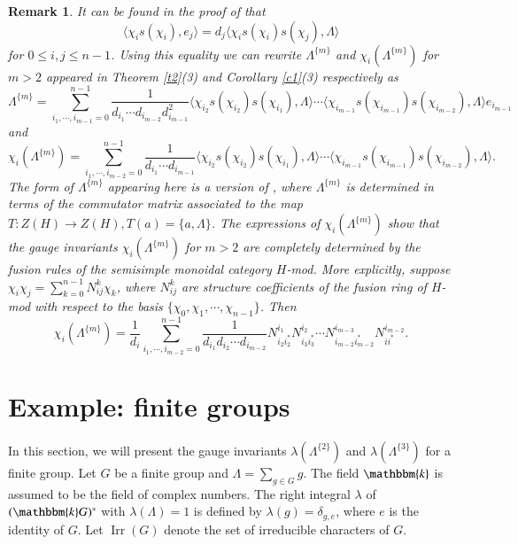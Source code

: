 \documentclass[11pt]{amsart}
\newtheorem{rem}[thm]{Remark}
\numberwithin{equation}{section}
\begin{document}
\begin{rem}
It can be found in the proof of \cite[Proposition 2.1(1)]{CW} that $$\langle\chi_{i}s(\chi_{i}),e_{j}\rangle=d_j\langle\chi_{i}s(\chi_{i})s(\chi_{j}),\Lambda\rangle$$ for $0\leq i,j\leq n-1$. Using this equality we can rewrite  $\Lambda^{\{m\}}$ and $\chi_i(\Lambda^{\{m\}})$ for $m>2$ appeared in Theorem \ref{t2}(3) and Corollary \ref{c1}(3) respectively as 
$$\Lambda^{\{m\}}=\sum_{i_1,\cdots,i_{m-1}=0}^{n-1}\frac{1}{d_{i_1}\cdots d_{i_{m-2}} d^2_{i_{m-1}}}\langle\chi_{i_2}s(\chi_{i_2})s(\chi_{i_1}),\Lambda\rangle\cdots \langle\chi_{i_{m-1}}s(\chi_{i_{m-1}})s(\chi_{i_{m-2}}),\Lambda\rangle e_{i_{m-1}}
$$ and
$$\chi_i(\Lambda^{\{m\}})=\sum_{i_1,\cdots,i_{m-2}=0}^{n-1}\frac{1}{d_{i_1}\cdots d_{i_{m-1}}}\langle\chi_{i_2}s(\chi_{i_2})s(\chi_{i_1}),\Lambda\rangle\cdots \langle\chi_{i_{m-1}}s(\chi_{i_{m-1}})s(\chi_{i_{m-2}}),\Lambda\rangle.$$
The form of $\Lambda^{\{m\}}$ appearing here is a version of  \cite[Proposition 2.2]{CW}, where $\Lambda^{\{m\}}$ is determined in terms of the commutator matrix associated to the map $T:Z(H)\rightarrow Z(H), T(a)=\{a,\Lambda\}$. The expressions of $\chi_i(\Lambda^{\{m\}})$ show that 
the gauge invariants  $\chi_i(\Lambda^{\{m\}})$ for  $m>2$ are completely determined by the fusion rules of the semisimple monoidal category $H$-mod. More explicitly, suppose $\chi_i\chi_j=\sum_{k=0}^{n-1}N_{ij}^k\chi_k$, where $N_{ij}^k$ are structure coefficients of the fusion ring of  $H$-mod with respect to the basis $\{\chi_0,\chi_1,\cdots,\chi_{n-1}\}$. Then $$\chi_i(\Lambda^{\{m\}})=\frac{1}{d_i}\sum_{i_1,\cdots,i_{m-2}=0}^{n-1}\frac{1}{d_{i_1}d_{i_2}\cdots d_{i_{m-2}}} N_{i_2i_2^*}^{i_1}N_{i_3i_3^*}^{i_2}\cdots N_{i_{m-2}i_{m-2}^*}^{i_{m-3}}N_{ii^*}^{i_{m-2}}.$$
\end{rem}



\section{\bf Example: finite groups}
 In this section, we will present the gauge invariants $\lambda(\Lambda^{\{2\}})$ and  $\lambda(\Lambda^{\{3\}})$ for a finite group. Let $G$ be a finite group and $\Lambda=\sum_{g\in G}g$. The field $\mathbbm{k}$  is assumed to be the field of complex numbers. The right integral $\lambda$ of $(\mathbbm{k}G)^*$ with $\lambda(\Lambda)=1$ is defined by $\lambda(g)=\delta_{g,e}$, where $e$ is the identity of $G$. Let $\operatorname{Irr}(G)$ denote the set of irreducible characters of $G$.
\end{document}
